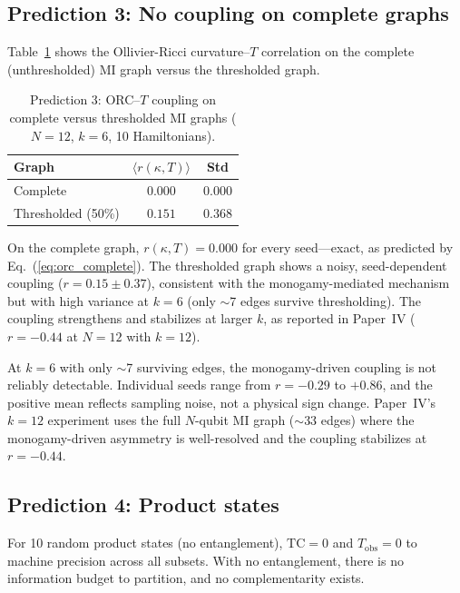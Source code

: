 \documentclass[aps,pra,twocolumn,superscriptaddress,floatfix]{revtex4-2}
\begin{document}
\subsection{Prediction 3: No coupling on complete graphs}

Table~\ref{tab:pred3} shows the Ollivier-Ricci curvature--$T$
correlation on the complete (unthresholded) MI graph versus
the thresholded graph.

\begin{table}[t]
\caption{Prediction 3: ORC--$T$ coupling on complete versus
thresholded MI graphs ($N = 12$, $k = 6$, 10 Hamiltonians).}
\label{tab:pred3}
\begin{ruledtabular}
\begin{tabular}{lcc}
Graph & $\langle r(\kappa, T) \rangle$ & Std \\
\hline
Complete & $0.000$ & $0.000$ \\
Thresholded (50\%) & $0.151$ & $0.368$ \\
\end{tabular}
\end{ruledtabular}
\end{table}

On the complete graph, $r(\kappa, T) = 0.000$ for every
seed---exact, as predicted by Eq.~(\ref{eq:orc_complete}).
The thresholded graph shows a noisy, seed-dependent
coupling ($r = 0.15 \pm 0.37$), consistent with
the monogamy-mediated mechanism but with high variance
at $k = 6$ (only $\sim$7 edges survive thresholding).
The coupling strengthens and stabilizes at larger $k$,
as reported in Paper~IV ($r = -0.44$ at $N = 12$ with $k = 12$).

At $k = 6$ with only $\sim$7 surviving edges,
the monogamy-driven coupling is not reliably detectable.
Individual seeds range from $r = -0.29$ to $+0.86$,
and the positive mean reflects sampling noise, not a
physical sign change.
Paper~IV's $k = 12$ experiment uses the full
$N$-qubit MI graph ($\sim$33 edges) where the
monogamy-driven asymmetry is well-resolved and
the coupling stabilizes at $r = -0.44$.

\subsection{Prediction 4: Product states}

For 10 random product states (no entanglement),
$\mathrm{TC} = 0$ and $T_\mathrm{obs} = 0$ to
machine precision across all subsets.  With no
entanglement, there is no information budget to
partition, and no complementarity exists.
\end{document}
